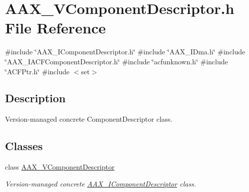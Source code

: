 \hypertarget{a00695}{}\section{A\+A\+X\+\_\+\+V\+Component\+Descriptor.\+h File Reference}
\label{a00695}
{\ttfamily \#include \char`\"{}A\+A\+X\+\_\+\+I\+Component\+Descriptor.\+h\char`\"{}}\newline
{\ttfamily \#include \char`\"{}A\+A\+X\+\_\+\+I\+Dma.\+h\char`\"{}}\newline
{\ttfamily \#include \char`\"{}A\+A\+X\+\_\+\+I\+A\+C\+F\+Component\+Descriptor.\+h\char`\"{}}\newline
{\ttfamily \#include \char`\"{}acfunknown.\+h\char`\"{}}\newline
{\ttfamily \#include \char`\"{}A\+C\+F\+Ptr.\+h\char`\"{}}\newline
{\ttfamily \#include $<$set$>$}\newline


\subsection{Description}
Version-\/managed concrete Component\+Descriptor class. 

\subsection*{Classes}
\begin{DoxyCompactItemize}
\item 
class \mbox{\hyperlink{a01901}{A\+A\+X\+\_\+\+V\+Component\+Descriptor}}
\begin{DoxyCompactList}\small\item\em Version-\/managed concrete \mbox{\hyperlink{a01781}{A\+A\+X\+\_\+\+I\+Component\+Descriptor}} class. \end{DoxyCompactList}\end{DoxyCompactItemize}
